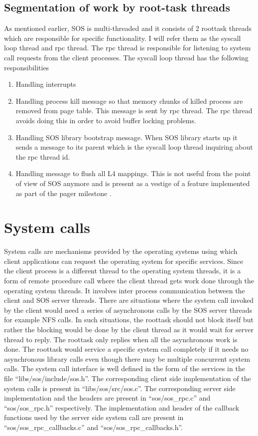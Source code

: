 \documentclass[a4paper, 11pt]{article}
\begin{document}
\subsection{Segmentation of work by root-task threads}
As mentioned earlier, SOS is multi-threaded and it consists of 2 roottask
threads which are responsible for specific functionality. I will refer
them as the syscall loop thread and rpc thread. The rpc thread is
responsible for listening to system call requests from the client
processes. The syscall loop thread has the following responsibilities
\begin{enumerate}
\item Handling interrupts
\item Handling process kill message so that memory chunks of killed
  process are removed from page table. This message is sent by rpc
  thread. The rpc thread avoids doing this in order to avoid buffer locking
  problems.
\item Handling SOS library bootstrap message. When SOS library starts
  up it sends a message to its parent which is the syscall loop thread
  inquiring about the rpc thread id.
\item Handling message to flush all L4 mappings. This is not useful
  from the point of view of SOS anymore and is present as a vestige of a
  feature implemented as part of the pager milestone \cite{os-project2}.
\end{enumerate}
\newpage
\section{System calls}
System calls are mechanisms provided by the operating systems using
which client applications can request the operating system for
specific services. Since the client process is a different thread to
the operating system threads, it is a form of remote procedure call where the client
thread gets work done through the operating system threads. It
involves inter process communication between the client and SOS server
threads. There are situations where the system call invoked by the
client would need a series of asynchronous calls by the SOS server
threads for example NFS calls. In such situations, the roottask should not
block itself but rather the blocking would be done by the client
thread as it would wait for server thread to reply. The roottask only
replies when all the asynchronous work is done. The roottask would
service a specific system call completely if it needs no asynchronous
library calls even though there may be multiple concurrent system
calls. The system call interface is well defined in the form of the
services in the file ``libs/sos/include/sos.h''. The corresponding
client side implementation of the system calls is present in
``libs/sos/src/sos.c''. The corresponding server side implementation
and the headers are present in ``sos/sos\_rpc.c'' and ``sos/sos\_rpc.h''
respectively. The implementation and header of the callback functions used by the
server side system call are present in ``sos/sos\_rpc\_callbacks.c'' and
``sos/sos\_rpc\_callbacks.h''. 
\end{document}
